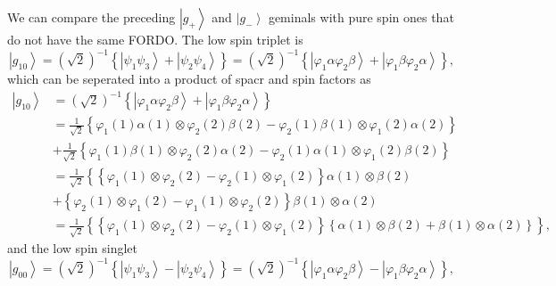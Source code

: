\documentclass[aps,preprint]{revtex4}%
\begin{document}
We can compare the preceding $\left\vert g_{+}\right\rangle $ and $\left\vert
g_{-}\right\rangle $ geminals with pure spin ones that do not have the same
FORDO. The low spin triplet is
\[
\left\vert g_{10}\right\rangle =\left(  \sqrt{2}\right)  ^{-1}\left\{
\left\vert \psi_{1}\psi_{3}\right\rangle +\left\vert \psi_{2}\psi
_{4}\right\rangle \right\}  =\left(  \sqrt{2}\right)  ^{-1}\left\{  \left\vert
\varphi_{1}\alpha\varphi_{2}\beta\right\rangle +\left\vert \varphi_{1}%
\beta\varphi_{2}\alpha\right\rangle \right\}  ,
\]
which can be seperated into a product of spacr and spin factors as%
\begin{align}
\left\vert g_{10}\right\rangle  &  =\left(  \sqrt{2}\right)  ^{-1}\left\{
\left\vert \varphi_{1}\alpha\varphi_{2}\beta\right\rangle +\left\vert
\varphi_{1}\beta\varphi_{2}\alpha\right\rangle \right\} \nonumber\\
&  =\frac{1}{\sqrt{2}}\left\{  \varphi_{1}\left(  1\right)  \alpha\left(
1\right)  \otimes\varphi_{2}\left(  2\right)  \beta\left(  2\right)
-\varphi_{2}\left(  1\right)  \beta\left(  1\right)  \otimes\varphi_{1}\left(
2\right)  \alpha\left(  2\right)  \right\} \nonumber\\
&  +\frac{1}{\sqrt{2}}\left\{  \varphi_{1}\left(  1\right)  \beta\left(
1\right)  \otimes\varphi_{2}\left(  2\right)  \alpha\left(  2\right)
-\varphi_{2}\left(  1\right)  \alpha\left(  1\right)  \otimes\varphi
_{1}\left(  2\right)  \beta\left(  2\right)  \right\} \nonumber\\
&  =\frac{1}{\sqrt{2}}\left\{  \left\{  \varphi_{1}\left(  1\right)
\otimes\varphi_{2}\left(  2\right)  -\varphi_{2}\left(  1\right)
\otimes\varphi_{1}\left(  2\right)  \right\}  \alpha\left(  1\right)
\otimes\beta\left(  2\right)  \right. \nonumber\\
&  +\left\{  \varphi_{2}\left(  1\right)  \otimes\varphi_{1}\left(  2\right)
-\varphi_{1}\left(  1\right)  \otimes\varphi_{2}\left(  2\right)  \right\}
\beta\left(  1\right)  \otimes\alpha\left(  2\right) \nonumber\\
&  =\frac{1}{\sqrt{2}}\left\{  \left\{  \varphi_{1}\left(  1\right)
\otimes\varphi_{2}\left(  2\right)  -\varphi_{2}\left(  1\right)
\otimes\varphi_{1}\left(  2\right)  \right\}  \left\{  \alpha\left(  1\right)
\otimes\beta\left(  2\right)  +\beta\left(  1\right)  \otimes\alpha\left(
2\right)  \right\}  \right\}  ,
\end{align}
and the low spin singlet%
\[
\left\vert g_{00}\right\rangle =\left(  \sqrt{2}\right)  ^{-1}\left\{
\left\vert \psi_{1}\psi_{3}\right\rangle -\left\vert \psi_{2}\psi
_{4}\right\rangle \right\}  =\left(  \sqrt{2}\right)  ^{-1}\left\{  \left\vert
\varphi_{1}\alpha\varphi_{2}\beta\right\rangle -\left\vert \varphi_{1}%
\beta\varphi_{2}\alpha\right\rangle \right\}  ,
\]
\end{document}
